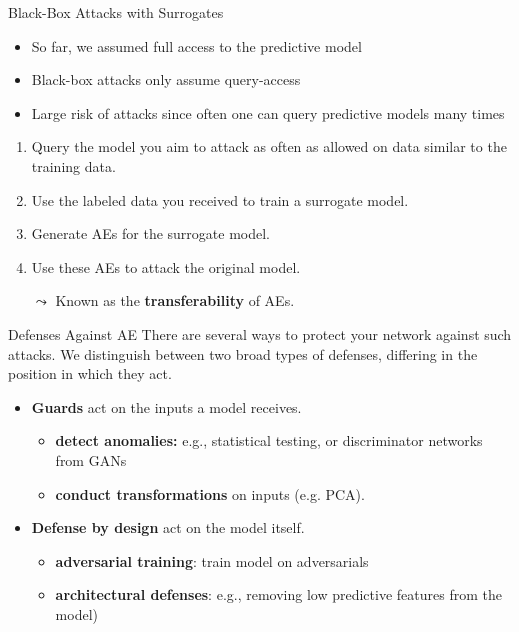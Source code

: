\documentclass[11pt,compress,t,notes=noshow, aspectratio=169, xcolor=table]{beamer}
\begin{document}
\begin{vbframe}[c]{Black-Box Attacks with Surrogates }

\begin{itemize}
    \item So far, we assumed full access to the predictive model
    \item Black-box attacks only assume query-access
    \item Large risk of attacks since often one can query predictive models many times
\end{itemize}

\medskip
\begin{enumerate}
    \item Query the model you aim to attack as often as allowed on data similar to the training data.
    \item Use the labeled data you received to train a surrogate model.
    \item Generate AEs for the surrogate model.
    \item Use these AEs to attack the original model.
\end{enumerate}

\medskip
\begin{itemize}
    \item[$\leadsto$] Known as the \textbf{transferability} of AEs.
\end{itemize}



\end{vbframe}

\begin{vbframe}[c]{Defenses Against AE}
There are several ways to protect your network against such attacks. We distinguish between two broad types of defenses, differing in the position in which they act.
\begin{itemize}
    \item \textbf{Guards} act on the inputs a model receives.
    \begin{itemize}
        \item \textbf{detect anomalies:} e.g., statistical testing, or discriminator networks from GANs
        \item \textbf{conduct transformations} on inputs (e.g. PCA).
    \end{itemize}
    \item \textbf{Defense by design} act on the model itself.
    \begin{itemize}
        \item \textbf{adversarial training}: train model on adversarials
        \item \textbf{architectural defenses}: e.g., removing low predictive features from the model)
    \end{itemize}
\end{itemize}
\end{vbframe}
\end{document}
